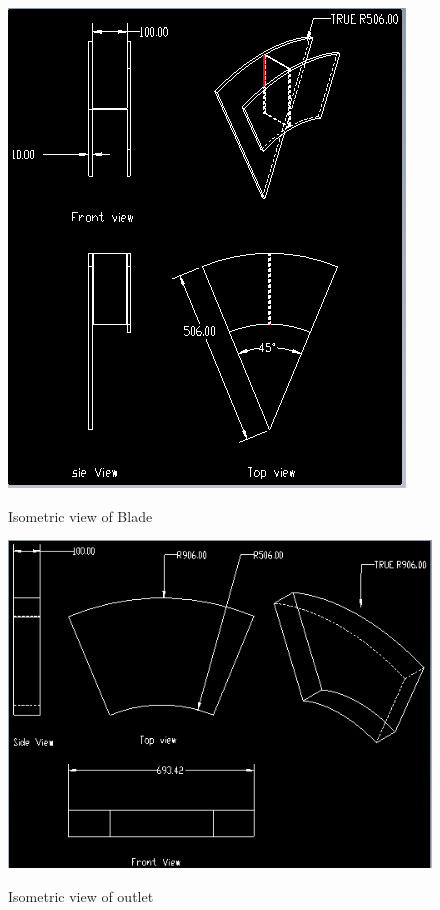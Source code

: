 \documentclass[11pt]{article}
\begin{document}
 \begin{center}
 \begin{figure}[hbt!]
 \centering
 \includegraphics[scale=.6]{blade.png}\\
 \caption{Isometric view of Blade}
 \end{figure}
 \end{center}
 \begin{center}
 \begin{figure}[hbt!]
 \centering
 \includegraphics[scale=.6]{outlet.png}\\
 \caption{Isometric view of outlet}
 \end{figure}
 \end{center}
 
\end{document}
